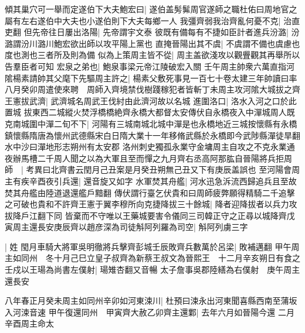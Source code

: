 傾其巢穴可一舉而定遂伯下大夫鮑宏曰|{
	遂伯盖髣髴周官遂師之職杜佑曰周地官之屬有左右遂伯中大夫也小遂伯則下大夫每鄉一人}
我彊齊弱我治齊亂何憂不克|{
	治直吏翻}
但先帝往日屢出洛陽|{
	先帝謂宇文泰}
彼既有備每有不捷如臣計者進兵汾潞|{
	汾潞謂汾川潞川鮑宏欲出師以攻平陽上黨也}
直掩晉陽出其不虞|{
	不虞謂不備也虞慮也度也測也三者所及則為備}
似為上策周主皆不從|{
	周主盖欲淺攻以觀舋觀其再舉所以告羣臣者可知}
宏泉之弟也|{
	鮑泉事梁元帝江陵破宏入關}
壬午周主帥衆六萬直指河隂楊素請帥其父麾下先驅周主許之|{
	楊素父敷死事見一百七十卷太建三年帥讀曰率}
八月癸卯周遣使來聘　周師入齊境禁伐樹踐稼犯者皆斬丁未周主攻河隂大城拔之齊王憲拔武濟|{
	武濟城名周武王伐紂由此濟河故以名城}
進圍洛口|{
	洛水入河之口於此置城}
拔東西二城縱火焚浮橋橋絶齊永橋大都督太安傳伏自永橋夜入中潬城周人既克南城圍中潬二旬不下|{
	河陽有三城南城北城中潬是也永橋地近三城按懷縣有永橋鎮懷縣隋唐為懷州武德縣宋白日隋大業十一年移脩武縣於永橋即今武陟縣潬徒旱翻水中沙曰潬地形志朔州有太安郡}
洛州刺史獨孤永業守金墉周主自攻之不克永業通夜辦馬槽二千周人聞之以為大軍且至而憚之九月齊右丞高阿那肱自晉陽將兵拒周師　|{
	考異曰北齊書云閏月己丑案是月癸丑朔無己丑又下有庚辰盖誤也}
至河陽會周主有疾辛酉夜引兵還|{
	還音旋又如字}
水軍焚其舟艦|{
	河水迅急泝流西歸追兵且至故焚其舟艦由陸道退還艦戶黯翻}
傳伏謂行臺乞伏貴和曰周師疲弊願得精騎二千追擊之可破也貴和不許齊王憲于翼李穆所向克捷降拔三十餘城|{
	降者迎降拔者以兵力攻拔降戶江翻下同}
皆棄而不守唯以王藥城要害令儀同三司韓正守之正尋以城降齊戊寅周主還長安庚辰齊以趙彦深為司徒斛阿列羅為司空|{
	斛阿列虜三字}


|{
	姓}
閠月車騎大將軍吳明徹將兵擊齊彭城壬辰敗齊兵數萬於呂梁|{
	敗補邁翻}
甲午周主如同州　冬十月己巳立皇子叔齊為新蔡王叔文為晉熙王　十二月辛亥朔日有食之　壬戍以王瑒為尚書左僕射|{
	瑒雉杏翻又音暢}
太子詹事吳郡陸繕為右僕射　庚午周主還長安

八年春正月癸未周主如同州辛卯如河東涑川|{
	杜預曰涑永出河東聞喜縣西南至蒲坂入河涑音速}
甲午復還同州　甲寅齊大赦乙卯齊主還鄴|{
	去年六月如晉陽今還}
二月辛酉周主命太

